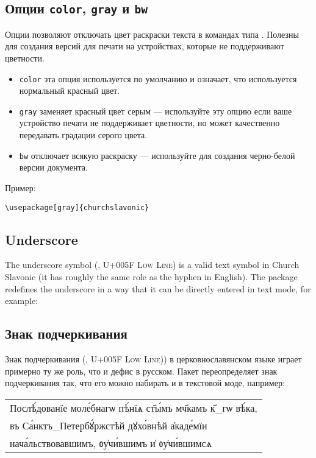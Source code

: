 \begin{RU}
\subsection{Опции \texttt{color}, \texttt{gray} и \texttt{bw}}
Опции позволяют отключать цвет раскраски текста в командах типа .
Полезны для создания версий для печати на
устройствах, которые не поддерживают цветности.

\begin{itemize}
\item \texttt{color} эта опция используется по умолчанию и означает,
что используется нормальный красный цвет.
\item \texttt{gray} заменяет красный цвет серым --- используйте эту опцию если
ваше устройство печати не поддерживает цветности, но может качественно передавать градации серого цвета.
\item \texttt{bw} отключает всякую раскраску --- используйте для создания черно-белой версии документа.
\end{itemize}
Пример:
\end{RU}

\begin{verbatim}
\usepackage[gray]{churchslavonic}
\end{verbatim}

\begin{EN}
\subsection{Underscore}
The underscore symbol (\texttt{\textunderscore}, U+005F \textsc{Low Line})
 is a valid text symbol in Church Slavonic (it has roughly the same role
as the hyphen in English). The package  redefines the
underscore in a way that it can be directly entered in text mode, for example:
\end{EN}
%
\begin{RU}
\subsection{Знак подчеркивания}
Знак подчеркивания (\texttt{\textunderscore}, U+005F \textsc{Low Line}))
в церковнославянском языке играет примерно ту же роль, что и дефис в русском.
Пакет  переопределяет знак подчеркивания так, что его можно
набирать и в текстовой моде, например:
\end{RU}
%
\begin{center}
\begin{churchslavonic}
\begin{tabular}{l}
Послѣ́дованїе моле́бнагѡ пѣ́нїѧ ст҃ы́мъ мч҃камъ к҃_гѡ вѣ́ка, \\
въ Са́нктъ_Петербꙋ́ржстѣй дꙋхо́внѣй а҆каде́мїи \\
нача́льствовавшимъ, ᲂу҆чи́вшимъ и҆ ᲂу҆чи́вшимсѧ \\
\end{tabular}
\end{churchslavonic}
\end{center}

